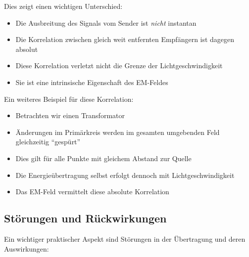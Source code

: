\documentclass[12pt,a4paper]{article}
\begin{document}
	Dies zeigt einen wichtigen Unterschied:
	\begin{itemize}
		\item Die Ausbreitung des Signals vom Sender ist \textit{nicht} instantan
		\item Die Korrelation zwischen gleich weit entfernten Empfängern ist dagegen absolut
		\item Diese Korrelation verletzt nicht die Grenze der Lichtgeschwindigkeit
		\item Sie ist eine intrinsische Eigenschaft des EM-Feldes
	\end{itemize}
	
	Ein weiteres Beispiel für diese Korrelation:
	\begin{itemize}
		\item Betrachten wir einen Transformator
		\item Änderungen im Primärkreis werden im gesamten umgebenden Feld gleichzeitig ``gespürt''
		\item Dies gilt für alle Punkte mit gleichem Abstand zur Quelle
		\item Die Energieübertragung selbst erfolgt dennoch mit Lichtgeschwindigkeit
		\item Das EM-Feld vermittelt diese absolute Korrelation
	\end{itemize}
	
	\subsection{Störungen und Rückwirkungen}
	Ein wichtiger praktischer Aspekt sind Störungen in der Übertragung und deren Auswirkungen:
	
\end{document}
